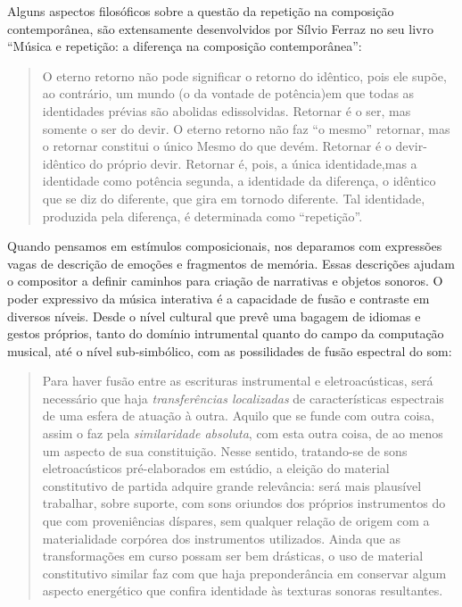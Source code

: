 \documentclass{ppgmus}
\begin{document}


Alguns aspectos filosóficos sobre a questão da repetição na composição contemporânea,
são extensamente desenvolvidos por Sílvio Ferraz no seu livro 
``Música e repetição: a diferença na composição contemporânea'':
 
\begin{quote}
O eterno retorno não pode significar o retorno do idêntico, pois ele supõe, 
ao contrário, um mundo (o da vontade de potência)em que todas as identidades 
prévias são abolidas edissolvidas. Retornar é o ser, mas somente o ser do devir. 
O eterno retorno não faz ``o mesmo'' retornar, mas o retornar constitui o único 
Mesmo do que devém. Retornar é o devir-idêntico do próprio devir. Retornar é, 
pois, a única identidade,mas a identidade como potência segunda, a identidade da 
diferença, o idêntico que se diz do diferente, que gira em tornodo diferente. 
Tal identidade, produzida pela diferença, é determinada como ``repetição''. \cite{ferraz1998musica}
\end{quote}


Quando pensamos em estímulos composicionais, nos deparamos com expressões
vagas de descrição de emoções e fragmentos de memória. Essas descrições
ajudam o compositor a definir caminhos para criação de narrativas e 
objetos sonoros. O poder expressivo da música interativa é a capacidade
de fusão e contraste em diversos níveis. Desde o nível cultural que prevê
uma bagagem de idiomas e gestos próprios, tanto do domínio intrumental quanto
do campo da computação musical, até o nível sub-simbólico, com as possilidades
de fusão espectral do som:

\begin{quote}

Para haver fusão entre as escrituras instrumental e eletroacústicas,
será necessário que haja \textit{transferências localizadas} de 
características espectrais de uma esfera de atuação à outra.
Aquilo que se funde com outra coisa, assim o faz pela \textit{similaridade
absoluta}, com esta outra coisa, de ao menos um aspecto de sua 
constituição. Nesse sentido, tratando-se de sons eletroacústicos 
pré-elaborados em estúdio, a eleição do material constitutivo de partida
adquire grande relevância: será mais plausível trabalhar, sobre suporte,
com sons oriundos dos próprios instrumentos do que com proveniências
díspares, sem qualquer relação de origem com a materialidade corpórea
dos instrumentos utilizados. Ainda que as transformações em curso possam ser
bem drásticas, o uso de material constitutivo similar faz com que
haja preponderância em conservar algum aspecto energético que confira
identidade às texturas sonoras resultantes. \cite{menezes2006musica}
\end{quote}
\end{document}
